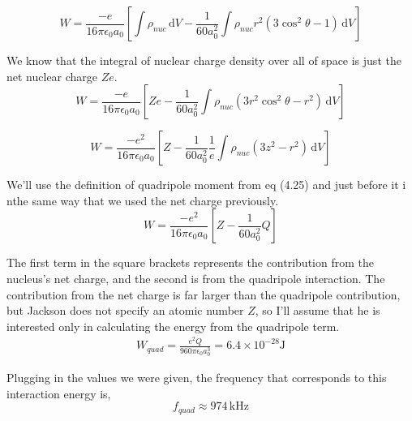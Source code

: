 \documentclass[10pt,a4paper]{article}
\begin{document}
\begin{equation}
W=\frac{-e}{16\pi\epsilon_0a_0}\left[\int\rho_{nuc}\,\mathrm{d}V-\frac{1}{60a_0^2}\int\rho_{nuc}r^2(3\cos^2\theta-1)\,\mathrm{d}V\right]
\end{equation}

We know that the integral of nuclear charge density over all of space is just the net nuclear charge $Ze$.
\begin{equation}
W=\frac{-e}{16\pi\epsilon_0a_0}\left[Ze-\frac{1}{60a_0^2}\int\rho_{nuc}(3r^2\cos^2\theta-r^2)\,\mathrm{d}V\right]
\end{equation}

\begin{equation}
W=\frac{-e^2}{16\pi\epsilon_0a_0}\left[Z-\frac{1}{60a_0^2}\frac{1}{e}\int\rho_{nuc}(3z^2-r^2)\,\mathrm{d}V\right]
\end{equation}

We'll use the definition of quadripole moment from eq (4.25) and just before it i nthe same way that we used the net charge previously.
\begin{equation}
W=\frac{-e^2}{16\pi\epsilon_0a_0}\left[Z-\frac{1}{60a_0^2}Q\right]
\end{equation}

The first term in the square brackets represents the contribution from the nucleus's net charge, and the second is from the quadripole interaction.  The contribution from the net charge is far larger than the quadripole contribution, but Jackson does not specify an atomic number $Z$, so I'll assume that he is interested only in calculating the energy from the quadripole term.
\begin{align}
W_{quad}=\frac{e^2Q}{960\pi\epsilon_0 a_0^3}=6.4\times 10^{-28} \mathrm{J}
\end{align}

Plugging in the values we were given, the frequency that corresponds to this interaction energy is,
\begin{equation}\boxed{
f_{quad}\approx974\,\mathrm{kHz}
}\end{equation}
\end{document}

